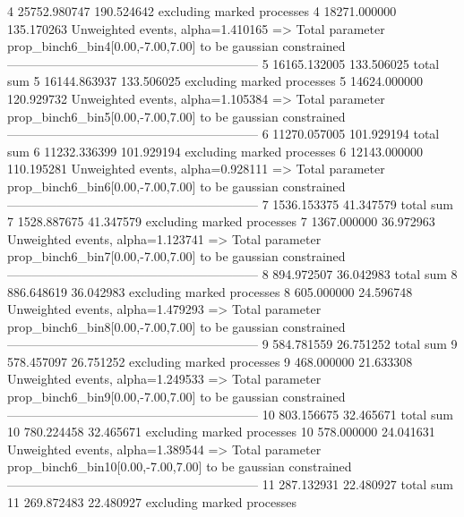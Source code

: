 4          25752.980747    190.524642      excluding marked processes    
4          18271.000000    135.170263      Unweighted events, alpha=1.410165
  => Total parameter prop_binch6_bin4[0.00,-7.00,7.00] to be gaussian constrained
------------------------------------------------------------
5          16165.132005    133.506025      total sum                     
5          16144.863937    133.506025      excluding marked processes    
5          14624.000000    120.929732      Unweighted events, alpha=1.105384
  => Total parameter prop_binch6_bin5[0.00,-7.00,7.00] to be gaussian constrained
------------------------------------------------------------
6          11270.057005    101.929194      total sum                     
6          11232.336399    101.929194      excluding marked processes    
6          12143.000000    110.195281      Unweighted events, alpha=0.928111
  => Total parameter prop_binch6_bin6[0.00,-7.00,7.00] to be gaussian constrained
------------------------------------------------------------
7          1536.153375     41.347579       total sum                     
7          1528.887675     41.347579       excluding marked processes    
7          1367.000000     36.972963       Unweighted events, alpha=1.123741
  => Total parameter prop_binch6_bin7[0.00,-7.00,7.00] to be gaussian constrained
------------------------------------------------------------
8          894.972507      36.042983       total sum                     
8          886.648619      36.042983       excluding marked processes    
8          605.000000      24.596748       Unweighted events, alpha=1.479293
  => Total parameter prop_binch6_bin8[0.00,-7.00,7.00] to be gaussian constrained
------------------------------------------------------------
9          584.781559      26.751252       total sum                     
9          578.457097      26.751252       excluding marked processes    
9          468.000000      21.633308       Unweighted events, alpha=1.249533
  => Total parameter prop_binch6_bin9[0.00,-7.00,7.00] to be gaussian constrained
------------------------------------------------------------
10         803.156675      32.465671       total sum                     
10         780.224458      32.465671       excluding marked processes    
10         578.000000      24.041631       Unweighted events, alpha=1.389544
  => Total parameter prop_binch6_bin10[0.00,-7.00,7.00] to be gaussian constrained
------------------------------------------------------------
11         287.132931      22.480927       total sum                     
11         269.872483      22.480927       excluding marked processes    
